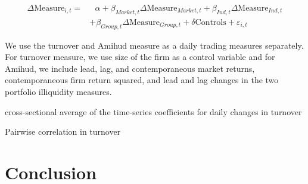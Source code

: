 \documentclass[12pt, a4paper]{article}
\begin{document}
\begin{equation*}
	\begin{split}
		\Delta \text{Measure}_{i,t} =  & \text{	}\alpha + \beta_{Market,t} \Delta \text{Measure}_{Market,t}  
		+ \beta_{Ind,t} \Delta \text{Measure}_{Ind,t} \\ & + \beta_{Group,t} \Delta \text{Measure}_{Group,t} + \delta\text{Controls} + \varepsilon_{i,t}
	\end{split}
\end{equation*}

We use the turnover and Amihud measure as a daily trading measures separately. For turnover measure, we use size of the firm as a control variable and for Amihud, we include lead, lag, and contemporaneous market returns, contemporaneous firm return squared, and lead and lag changes in the two portfolio illiquidity measures.

\begin{table}[htbp]
	\centering
	\caption{cross-sectional average of the time-series coefficients for daily changes in turnover }
	\resizebox{0.6\textheight}{!}{
		
	}
\end{table}


\begin{table}[htbp]
	\centering
		\caption{Pairwise correlation in turnover  }
	\resizebox{0.7\textheight}{!}{
		\centering
		
	}
\end{table}


\FloatBarrier
\section{Conclusion}
\end{document}
